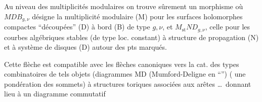 Au niveau des multiplicités modulaires 
on trouve sûrement un morphisme 
où $MDB_{g,\nu}$ désigne la multiplicité modulaire
(M) pour les surfaces holomorphes compactes
``découpées'' (D) à bord (B) de type $g,\nu$, et
$M_{\mathrm{st}}ND_{g,\nu}$, celle pour les courbes algébriques
stables (de type loc. constant)  à structure de
propagation  (N) et à système  de
disques (D) autour des pts marqués.

Cette flèche est compatible avec les
flèches canoniques vers la cat. des
types combinatoires de tels objets
(diagrammes MD (Mumford-Deligne en
``'') ( une pondération
des sommets) à structures toriques
associées aux arêtes \ldots\ donnant lieu à un
diagramme commutatif
